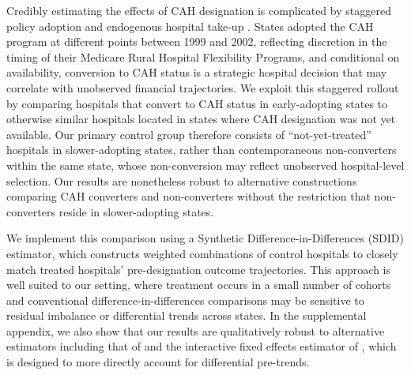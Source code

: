 \documentclass[a4paper, 12pt, twoside]{article}
\begin{document}
Credibly estimating the effects of CAH designation is complicated by staggered policy adoption and endogenous hospital take-up \citep{dalton2003}. States adopted the CAH program at different points between 1999 and 2002, reflecting discretion in the timing of their Medicare Rural Hospital Flexibility Programs, and conditional on availability, conversion to CAH status is a strategic hospital decision that may correlate with unobserved financial trajectories. We exploit this staggered rollout by comparing hospitals that convert to CAH status in early-adopting states to otherwise similar hospitals located in states where CAH designation was not yet available. Our primary control group therefore consists of ``not-yet-treated'' hospitals in slower-adopting states, rather than contemporaneous non-converters within the same state, whose non-conversion may reflect unobserved hospital-level selection. Our results are nonetheless robust to alternative constructions comparing CAH converters and non-converters without the restriction that non-converters reside in slower-adopting states.

We implement this comparison using a Synthetic Difference-in-Differences (SDID) estimator, which constructs weighted combinations of control hospitals to closely match treated hospitals’ pre-designation outcome trajectories. This approach is well suited to our setting, where treatment occurs in a small number of cohorts and conventional difference-in-differences comparisons may be sensitive to residual imbalance or differential trends across states. In the supplemental appendix, we also show that our results are qualitatively robust to alternative estimators including that of \cite{callaway2021} and the interactive fixed effects estimator of \cite{xu2017}, which is designed to more directly account for differential pre-trends.
\end{document}
